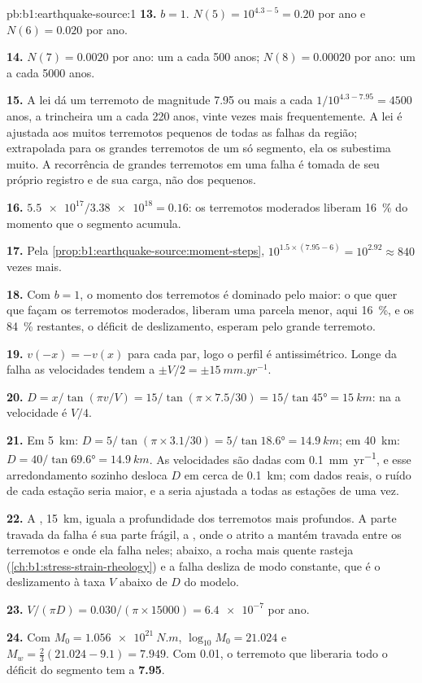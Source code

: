 \begin{solution}{pb:b1:earthquake-source:1}
\textbf{13.} $b = 1$. $N(5) = 10^{4.3 - 5} = 0.20$ por ano e $N(6) = 0.020$ por
ano.

\textbf{14.} $N(7) = 0.0020$ por ano: um a cada 500 anos; $N(8) = 0.00020$ por
ano: um a cada \num{5000} anos.

\textbf{15.} A lei dá um terremoto de magnitude 7.95 ou mais a cada
$1/10^{4.3 - 7.95} = \num{4500}$ anos, a trincheira um a cada 220 anos, vinte
vezes mais frequentemente. A lei é ajustada aos muitos terremotos pequenos de todas as falhas da região; extrapolada para os grandes terremotos de um só segmento, ela os subestima muito. A recorrência de grandes terremotos em uma falha é tomada de seu próprio registro e de sua carga, não dos pequenos.

\textbf{16.} $\num{5.5e17}/\num{3.38e18} = 0.16$: os terremotos moderados
liberam \qty{16}{\percent} do momento que o segmento acumula.

\textbf{17.} Pela \cref{prop:b1:earthquake-source:moment-steps},
$10^{1.5\times(7.95 - 6)} = 10^{2.92} \approx 840$ vezes mais.

\textbf{18.} Com $b = 1$, o momento dos terremotos é dominado pelo maior: o que quer que façam os terremotos moderados, liberam uma parcela menor, aqui
\qty{16}{\percent}, e os \qty{84}{\percent} restantes, o déficit de deslizamento, esperam pelo grande terremoto.

\textbf{19.} $v(-x) = -v(x)$ para cada par, logo o perfil é antissimétrico. Longe da falha as velocidades tendem a $\pm V/2 = \pm\qty{15}{mm.yr^{-1}}$.

\textbf{20.} $D = x/\tan(\pi v/V) = 15/\tan(\pi\times7.5/30) = 15/\tan\ang{45} =
\qty{15}{km}$: na  a velocidade é $V/4$.

\textbf{21.} Em \qty{5}{km}: $D = 5/\tan(\pi\times3.1/30) = 5/\tan\ang{18.6} =
\qty{14.9}{km}$; em \qty{40}{km}: $D = 40/\tan\ang{69.6} = \qty{14.9}{km}$. As velocidades são dadas com \qty{0.1}{mm.yr^{-1}}, e esse arredondamento sozinho desloca $D$ em cerca de \qty{0.1}{km}; com dados reais, o ruído de cada estação seria maior, e a  seria ajustada a todas as estações de uma vez.

\textbf{22.} A , \qty{15}{km}, iguala a profundidade dos terremotos mais profundos. A parte travada da falha é sua parte frágil, a , onde o atrito a mantém travada entre os terremotos e onde ela falha neles; abaixo, a rocha mais quente rasteja (\cref{ch:b1:stress-strain-rheology}) e a falha desliza de modo constante, que é o deslizamento à taxa $V$ abaixo de $D$ do modelo.

\textbf{23.} $V/(\pi D) = \num{0.030}/(\pi\times\num{15000}) = \num{6.4e-7}$
por ano.

\textbf{24.} Com $M_0 = \qty{1.056e21}{N.m}$, $\log_{10}M_0 = 21.024$ e
$M_w = \tfrac23(21.024 - 9.1) = 7.949$. Com 0.01, o terremoto que liberaria todo o déficit do segmento tem a 
\textbf{7.95}.
\end{solution}
